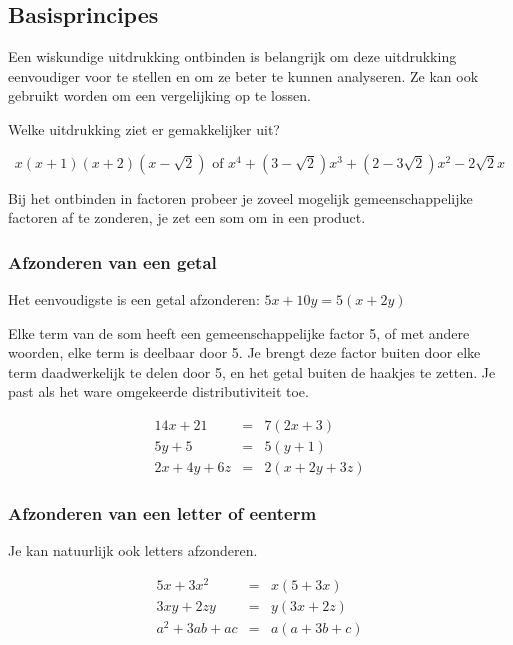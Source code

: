 \subsection{Basisprincipes}

Een wiskundige uitdrukking ontbinden is belangrijk om deze uitdrukking eenvoudiger voor te stellen en om ze beter te kunnen analyseren. Ze kan ook gebruikt worden om een vergelijking op te lossen.

Welke uitdrukking ziet er gemakkelijker uit?

\begin{equation*}
x(x+1)(x+2)(x-\sqrt{2}) \text{ of } x^4+(3-\sqrt{2})x^3+(2-3\sqrt{2})x^2-2\sqrt{2}x
\end{equation*}

Bij het ontbinden in factoren probeer je zoveel mogelijk gemeenschappelijke factoren af te zonderen, je zet een som om in een product.

\subsubsection{Afzonderen van een getal}
Het eenvoudigste is een getal afzonderen: $5x+10y=5(x+2y)$

Elke term van de som heeft een gemeenschappelijke factor 5, of met andere woorden, elke term is deelbaar door 5. Je brengt deze factor buiten door elke term daadwerkelijk te delen door 5, en het getal buiten de haakjes te zetten. Je past als het ware omgekeerde distributiviteit toe.

\begin{voorbeeld}
\begin{eqnarray*}
14x+21&=&7(2x+3)\\
5y+5&=&5(y+1)\\
2x+4y+6z&=&2(x+2y+3z)
\end{eqnarray*}
\end{voorbeeld}

\subsubsection{Afzonderen van een letter of eenterm}
Je kan natuurlijk ook letters afzonderen. 

\begin{voorbeeld}
\begin{eqnarray*}
5x+3x^2&=&x(5+3x) \\
3xy+2zy&=&y(3x+2z) \\
a^2+3ab+ac&=&a(a+3b+c)
\end{eqnarray*}
\end{voorbeeld}

